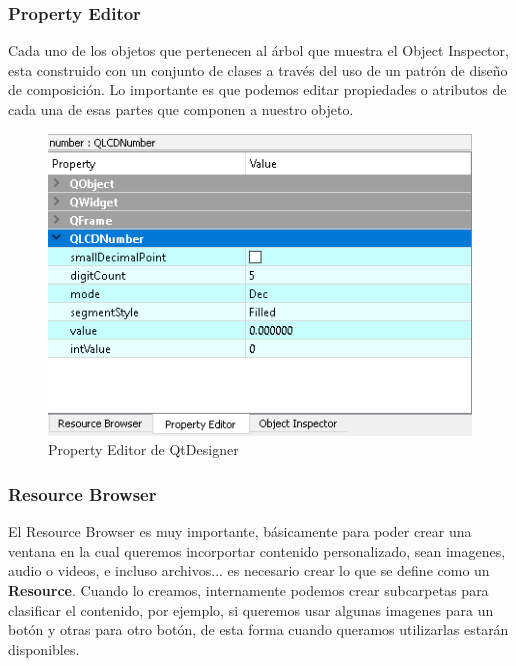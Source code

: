 \subsubsection{Property Editor}
Cada uno de los objetos que pertenecen al \'arbol que muestra el Object Inspector, esta construido con un conjunto de clases a trav\'es del uso de un 
patr\'on de dise\~no de composici\'on. Lo importante es que podemos editar propiedades o atributos de cada una de esas partes que componen a nuestro objeto.

\begin{figure}[H]
    \centering
    \includegraphics[scale=0.7]{imagenes/qtdesigner/qt_property_editor.PNG}
    \caption{Property Editor de QtDesigner}
    \label{fig:qt_property_editor}
\end{figure}

\subsubsection{Resource Browser}
El Resource Browser es muy importante, b\'asicamente para poder crear una ventana en la cual queremos incorportar contenido personalizado, sean imagenes,
audio o videos, e incluso archivos... es necesario crear lo que se define como un \textbf{Resource}. Cuando lo creamos, internamente podemos crear subcarpetas
para clasificar el contenido, por ejemplo, si queremos usar algunas imagenes para un bot\'on y otras para otro bot\'on, de esta forma cuando queramos utilizarlas estar\'an
disponibles.

